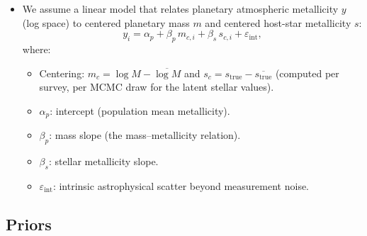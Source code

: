 \documentclass[twocolumn]{aastex631}
\begin{document}
\begin{itemize}
    \item We assume a linear model that relates planetary atmospheric
          metallicity $y$ (log space) to centered planetary mass $m$
          and centered host-star metallicity $s$:
    \begin{equation}\label{eq:metmodel}
        y_i = \alpha_p + \beta_p\, m_{c,i} + \beta_s\, s_{c,i}
              + \varepsilon_{\mathrm{int}},
    \end{equation}
    where:
    \begin{itemize}
        \item Centering: $m_c = \log M - \overline{\log M}$ and
              $s_c = s_{\mathrm{true}} - \overline{s_{\mathrm{true}}}$
              (computed per survey, per MCMC draw for the latent
              stellar values).
        \item $\alpha_p$: intercept (population mean metallicity).
        \item $\beta_p$: mass slope (the mass--metallicity relation).
        \item $\beta_s$: stellar metallicity slope.
        \item $\varepsilon_{\mathrm{int}}$: intrinsic astrophysical
              scatter beyond measurement noise.
    \end{itemize}
\end{itemize}

\subsection{Priors}\label{sec:priors}
\end{document}

